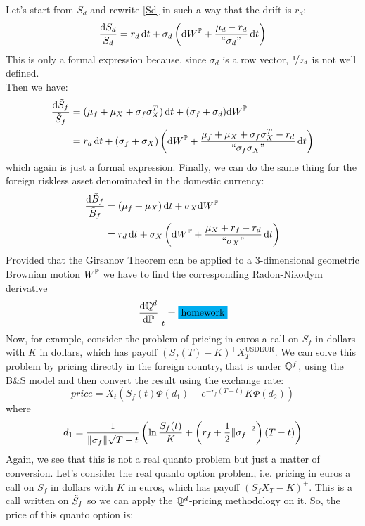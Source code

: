 Let's start from $S_d$ and rewrite \eqref{Sd} in such a way that the drift is $r_d$:
\begin{align}
    \frac{\dd S_d}{S_d} = r_d\,\dd t + \sigma_d\left(\dd W^{\mathbb{P}} + \frac{\mu_d-r_d}{``\sigma_d"}\,\dd t\right)
\end{align}
This is only a formal expression because, since $\sigma_d$ is a row vector, $\nicefrac{1}{\sigma_d}$ is not well defined.\\
Then we have:
\begin{align}
    \notag\frac{\dd\Tilde{S}_f}{\Tilde{S}_f} &= (\mu_f+\mu_X+\sigma_f\sigma^T_X)\,\dd t + (\sigma_f + \sigma_d)\dd W^{\mathbb{P}} \\
    &=
    r_d\,\dd t + (\sigma_f+\sigma_X)\left(\dd W^{\mathbb{P}}+\dfrac{\mu_f + \mu_X + \sigma_f\sigma_X^T - r_d}{``\sigma_f\sigma_X"}\,\dd t\right)
\end{align}
which again is just a formal expression. Finally, we can do the same thing for the foreign riskless asset denominated in the domestic currency:
\begin{align}
    \notag\frac{\dd\Tilde{B}_f}{\Tilde{B}_f} &= (\mu_f+\mu_X)\,\dd t + \sigma_X\dd W^{\mathbb{P}} \\
    &=
    r_d\,\dd t + \sigma_X\left(\dd W^{\mathbb{P}}+\dfrac{\mu_X + r_f - r_d}{``\sigma_X"}\,\dd t\right)
\end{align}
Provided that the Girsanov Theorem can be applied to a 3-dimensional geometric Brownian motion $W^{\mathbb{P}}$ we have to find the corresponding Radon-Nikodym derivative
\begin{equation} %
    \eval{\dfrac{\dd\Qmeas^d}{\dd\Pmeas}}_t = \colorbox{cyan}{homework}
\end{equation}
Now, for example, consider the problem of pricing in euros a call on $S_f$ in dollars with $K$ in dollars, which has payoff $(S_f(T)-K)^+X_T^{\text{USDEUR}}$. We can solve this problem by pricing directly in the foreign country, that is under $\mathbb{Q}^f$, using the B\&S model and then convert the result using the exchange rate:
\begin{equation}
    price = X_t(S_f(t)\Phi(d_1)-e^{-r_f(T-t)}K\Phi(d_2))
\end{equation}
where
\begin{equation}
    d_1 = \frac{1}{\norm{\sigma_f}\sqrt{T-t}}\left(\ln\frac{S_f(t)}{K}+\left(r_f+\frac{1}{2}\norm{\sigma_f}^2\right)(T-t)\right)
\end{equation}
Again, we see that this is not a real quanto problem but just a matter of conversion.
Let's consider the real quanto option problem, i.e. pricing in euros a call on $S_f$ in dollars with $K$ in euros, which has payoff $(S_f X_T-K)^+$. This is a call written on $\Tilde{S}_f$ so we can apply the $\mathbb{Q}^d$-pricing methodology on it. So, the price of this quanto option is:
